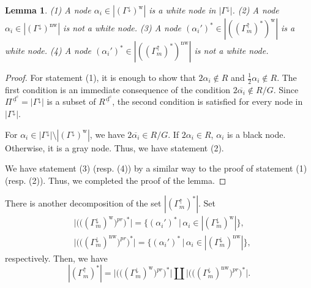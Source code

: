 \documentclass[11pt]{amsart}
\newcommand{\dc}{\,\underline{\mathrm{d}}^c}
\newcommand{\w}{\mathrm{w}}
\newcommand{\nw}{\mathrm{nw}}
\newtheorem{lemma}[thm]{Lemma}%
\begin{document}
{\begin{lemma}\label{lemma:color}
{\rm (1)} A node $\alpha_i\in |(\Gamma^\downarrow)^\w|$ is a 
white node in $|\Gamma^\downarrow|$. 
\vskip 1mm
\noindent
{\rm (2)} A node $\alpha_i\in |(\Gamma^\downarrow)^\nw|$ is not a white node.
\vskip 1mm
\noindent
{\rm (3)} A node $(\alpha_i')^\ast\in |((\Gamma_m^\uparrow)^\ast)^\w|$ is 
a white node.
\vskip 1mm
\noindent
{\rm (4)} A node $(\alpha_i')^\ast\in |((\Gamma_m^\uparrow)^\ast)^\nw |$
is not a white node.  
\end{lemma}
\begin{proof}
For statement (1), it is enough to show that $2\alpha_i\not\in R$ and 
$\frac12 \alpha_i\not\in R$.
The first condition is an immediate consequence of the condition
$2\overline{\alpha_i}\not\in R/G$. Since $\Pi^{\dc}=|\Gamma^{\downarrow}|$ is a subset of $R^{\dc}$, 
the second condition is satisfied for every node in $|\Gamma^{\downarrow}|$. 

For $\alpha_i\in |\Gamma^{\downarrow}|\setminus 
|(\Gamma^\downarrow)^\w |$, we have 
$2\overline{\alpha_i}\in R/G$. If $2\alpha_i\in R$, $\alpha_i$ is a black node.
Otherwise, it is a gray node. Thus, we have statement (2). 

We have statement (3) (resp. (4)) by a similar way to the
proof of statement (1) (resp. (2)). Thus, we completed  the proof of the lemma.
\end{proof}

There is another decomposition of the set 
$|(\Gamma^\uparrow_m)^\ast|$. Set
\begin{align*}
&\big|\big(\big((\Gamma_m^\downarrow)^\w\big)^{pr}\big)^\ast\big|=
\big\{(\alpha_i')^\ast\,\big|\,\alpha_i\in 
|(\Gamma^\downarrow_m)^\w| \big\}, \\
&
\big|\big(\big((\Gamma_m^\downarrow)^\nw\big)^{pr}\big)^\ast\big|=
\big\{(\alpha_i')^\ast\,\big|\,\alpha_i\in |(\Gamma_m^\downarrow)^\nw |
\big\},
\end{align*}
respectively.  Then, we have 
\begin{equation}\label{eq:decomp-upstair-2}
|(\Gamma^\uparrow_m)^\ast|=
\big|\big(\big((\Gamma_m^\downarrow)^\w\big)^{pr}\big)^\ast\big| \amalg
\big|\big(\big((\Gamma_m^\downarrow)^\nw\big)^{pr}\big)^\ast\big|.
\end{equation}

}
\end{document}
